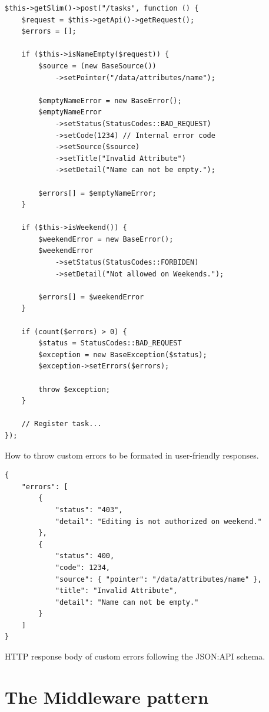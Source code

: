 \begin{listing}[htbp]
\begin{verbatim}
$this->getSlim()->post("/tasks", function () {
	$request = $this->getApi()->getRequest();
	$errors = [];

	if ($this->isNameEmpty($request)) {
        $source = (new BaseSource())
            ->setPointer("/data/attributes/name");

		$emptyNameError = new BaseError();
		$emptyNameError
			->setStatus(StatusCodes::BAD_REQUEST)
			->setCode(1234) // Internal error code
			->setSource($source)
			->setTitle("Invalid Attribute")
			->setDetail("Name can not be empty.");

		$errors[] = $emptyNameError;
	}

	if ($this->isWeekend()) {
		$weekendError = new BaseError();
		$weekendError
			->setStatus(StatusCodes::FORBIDEN)
		    ->setDetail("Not allowed on Weekends.");

		$errors[] = $weekendError
	}

	if (count($errors) > 0) {
        $status = StatusCodes::BAD_REQUEST
		$exception = new BaseException($status);
		$exception->setErrors($errors);

		throw $exception;
	}

	// Register task...
});
\end{verbatim}
\caption{How to throw custom errors to be formated in user-friendly responses.}
\label{code:custom-error-example}
\end{listing}

\begin{listing}[htbp]
\begin{verbatim}
{
    "errors": [
        {
            "status": "403",
            "detail": "Editing is not authorized on weekend."
        },
        {
            "status": 400,
            "code": 1234,
            "source": { "pointer": "/data/attributes/name" },
            "title": "Invalid Attribute",
            "detail": "Name can not be empty."
        }
    ]
}
\end{verbatim}
\caption{HTTP response body of custom errors following the JSON:API schema.}
\label{code:custom-error-response-example}
\end{listing}

\section{The Middleware pattern}
\label{sec:middleware}


